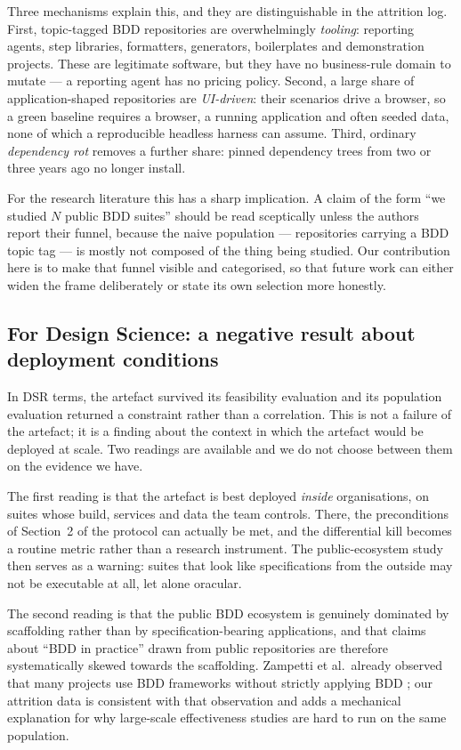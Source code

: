 Three mechanisms explain this, and they are distinguishable in the attrition log. First, topic-tagged
BDD repositories are overwhelmingly \emph{tooling}: reporting agents, step libraries, formatters,
generators, boilerplates and demonstration projects. These are legitimate software, but they have no
business-rule domain to mutate --- a reporting agent has no pricing policy. Second, a large share of
application-shaped repositories are \emph{UI-driven}: their scenarios drive a browser, so a green
baseline requires a browser, a running application and often seeded data, none of which a
reproducible headless harness can assume. Third, ordinary \emph{dependency rot} removes a further
share: pinned dependency trees from two or three years ago no longer install.

For the research literature this has a sharp implication. A claim of the form ``we studied $N$ public
BDD suites'' should be read sceptically unless the authors report their funnel, because the naive
population --- repositories carrying a BDD topic tag --- is mostly not composed of the thing being
studied. Our contribution here is to make that funnel visible and categorised, so that future work can
either widen the frame deliberately or state its own selection more honestly.

\subsection{For Design Science: a negative result about deployment conditions}

In DSR terms, the artefact survived its feasibility evaluation and its population evaluation returned
a constraint rather than a correlation. This is not a failure of the artefact; it is a finding about
the context in which the artefact would be deployed at scale. Two readings are available and we do not
choose between them on the evidence we have.

The first reading is that the artefact is best deployed \emph{inside} organisations, on suites whose
build, services and data the team controls. There, the preconditions of Section~2 of the protocol can
actually be met, and the differential kill becomes a routine metric rather than a research instrument.
The public-ecosystem study then serves as a warning: suites that look like specifications from the
outside may not be executable at all, let alone oracular.

The second reading is that the public BDD ecosystem is genuinely dominated by scaffolding rather than
by specification-bearing applications, and that claims about ``BDD in practice'' drawn from public
repositories are therefore systematically skewed towards the scaffolding. Zampetti et al.\ already
observed that many projects use BDD frameworks without strictly applying BDD
\citep{zampetti2020demystifying}; our attrition data is consistent with that observation and adds a
mechanical explanation for why large-scale effectiveness studies are hard to run on the same
population.

